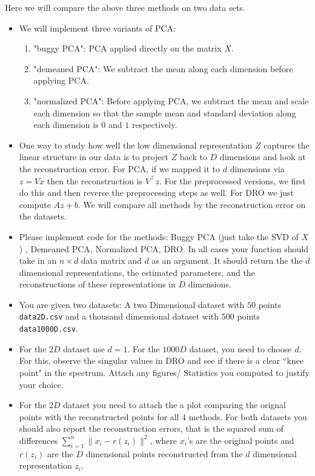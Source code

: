 \documentclass[a4paper]{article}
\theoremstyle{definition}
\begin{document}
Here we will compare the above three methods on two data sets. 

\begin{itemize}
\item We will implement three variants of PCA:
\begin{enumerate}
    \item "buggy PCA": PCA applied directly on the matrix $X$.
    \item "demeaned PCA": We subtract the mean along each dimension before applying PCA.
    \item "normalized PCA": Before applying PCA, we subtract the mean and scale each dimension so that the sample  mean and standard deviation along each dimension is $0$ and $1$ respectively.
    
\end{enumerate}



\item 
One way to study how well the low dimensional representation $Z$ captures the linear
structure in our data is to project $Z$ back to $D$ dimensions and look at the reconstruction
error. For PCA, if we mapped it to $d$ dimensions via $z = Vx$ then the
reconstruction is $V^\top z$. For the preprocessed versions, we first do this and then
reverse the preprocessing steps as well. For DRO  we just compute $Az + b$.
We will compare all methods by the reconstruction error on the datasets.

\item 
Please implement code for the methods: Buggy PCA (just take the SVD of $X$)
, Demeaned PCA,
Normalized PCA, DRO. In all cases your function should take in
an $n \times d$ data matrix and $d$ as an argument. It should return the
the $d$ dimensional representations, the estimated parameters, and the
reconstructions of these representations in $D$ dimensions. 

\item
You are given two datasets: A two Dimensional dataset with $50$ points 
\texttt{data2D.csv} and a thousand dimensional dataset with $500$ points
\texttt{data1000D.csv}. 

\item
For the $2D$ dataset use $d=1$. For the $1000D$ dataset, you need to choose
$d$. For this, observe the singular values in DRO and see if there is a clear
``knee point" in the spectrum.
Attach any figures/ Statistics you computed to justify your choice.

\item
For the $2D$ dataset you need to attach the a 
plot comparing the orignal points with the reconstructed points for all 4
methods.
For both datasets you should also report the reconstruction errors, that is the squared sum of
differences $\sum_{i=1}^n \|x_i - r(z_i)\|^2$,
where $x_i$'s are the original points and $r(z_i)$ are the $D$ dimensional points
reconstructed from the 
$d$ dimensional representation $z_i$.


\end{itemize}
\end{document}
